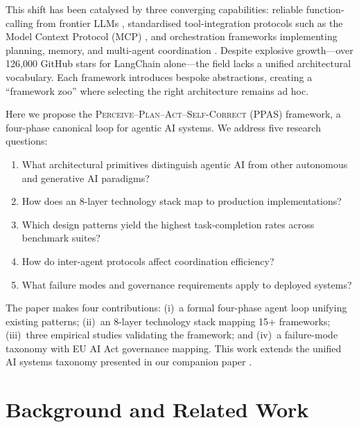 \documentclass[sn-basic]{sn-jnl}
\theoremstyle{definition}
\begin{document}
This shift has been catalysed by three converging capabilities: reliable function-calling from frontier LLMs \citep{openai2024gpt4o,anthropic2024claude}, standardised tool-integration protocols such as the Model Context Protocol (MCP) \citep{anthropic2024mcp}, and orchestration frameworks implementing planning, memory, and multi-agent coordination \citep{langchain2024langgraph,microsoft2024autogen}. Despite explosive growth---over 126,000 GitHub stars for LangChain alone---the field lacks a unified architectural vocabulary. Each framework introduces bespoke abstractions, creating a ``framework zoo'' where selecting the right architecture remains ad hoc.

Here we propose the \textsc{Perceive--Plan--Act--Self-Correct} (PPAS) framework, a four-phase canonical loop for agentic AI systems. We address five research questions:

\begin{enumerate}
    \item[\textbf{RQ1.}] What architectural primitives distinguish agentic AI from other autonomous and generative AI paradigms?
    \item[\textbf{RQ2.}] How does an 8-layer technology stack map to production implementations?
    \item[\textbf{RQ3.}] Which design patterns yield the highest task-completion rates across benchmark suites?
    \item[\textbf{RQ4.}] How do inter-agent protocols affect coordination efficiency?
    \item[\textbf{RQ5.}] What failure modes and governance requirements apply to deployed systems?
\end{enumerate}

The paper makes four contributions: (i)~a formal four-phase agent loop unifying existing patterns; (ii)~an 8-layer technology stack mapping 15+ frameworks; (iii)~three empirical studies validating the framework; and (iv)~a failure-mode taxonomy with EU AI Act governance mapping. This work extends the unified AI systems taxonomy presented in our companion paper \citep{mahdi2026taxonomy}.

\section{Background and Related Work}\label{sec:background}
\end{document}
